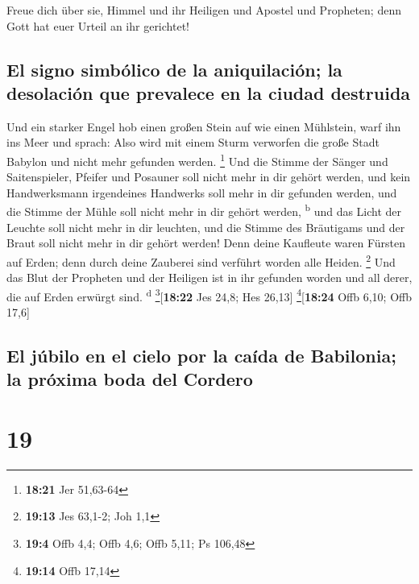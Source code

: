  Freue dich über sie, Himmel und ihr Heiligen und Apostel
und Propheten; denn Gott hat euer Urteil an ihr gerichtet!

\hypertarget{el-signo-simbuxf3lico-de-la-aniquilaciuxf3n-la-desolaciuxf3n-que-prevalece-en-la-ciudad-destruida}{%
\subsection{El signo simbólico de la aniquilación; la desolación que
prevalece en la ciudad
destruida}\label{el-signo-simbuxf3lico-de-la-aniquilaciuxf3n-la-desolaciuxf3n-que-prevalece-en-la-ciudad-destruida}}

 Und ein starker Engel hob einen großen Stein auf wie
einen Mühlstein, warf ihn ins Meer und sprach: Also wird mit einem Sturm
verworfen die große Stadt Babylon und nicht mehr gefunden werden.
\footnote{\textbf{18:21} Jer 51,63-64}  Und die Stimme
der Sänger und Saitenspieler, Pfeifer und Posauner soll nicht mehr in
dir gehört werden, und kein Handwerksmann irgendeines Handwerks soll
mehr in dir gefunden werden, und die Stimme der Mühle soll nicht mehr in
dir gehört werden, \textsuperscript{b}  und das Licht der
Leuchte soll nicht mehr in dir leuchten, und die Stimme des Bräutigams
und der Braut soll nicht mehr in dir gehört werden! Denn deine Kaufleute
waren Fürsten auf Erden; denn durch deine Zauberei sind verführt worden
alle Heiden. \footnote{\textbf{19:13} Jes 63,1-2; Joh 1,1}
 Und das Blut der Propheten und der Heiligen ist in ihr
gefunden worden und all derer, die auf Erden erwürgt sind.
\textsuperscript{d} \footnote{\textbf{19:4} Offb 4,4; Offb 4,6; Offb
  5,11; Ps 106,48}{[}\textbf{18:22} Jes 24,8; Hes 26,13{]}
\footnote{\textbf{19:14} Offb 17,14}{[}\textbf{18:24} Offb 6,10; Offb
17,6{]}

\hypertarget{el-juxfabilo-en-el-cielo-por-la-cauxedda-de-babilonia-la-pruxf3xima-boda-del-cordero}{%
\subsection{El júbilo en el cielo por la caída de Babilonia; la próxima
boda del
Cordero}\label{el-juxfabilo-en-el-cielo-por-la-cauxedda-de-babilonia-la-pruxf3xima-boda-del-cordero}}

\hypertarget{section-18}{%
\section{19}\label{section-18}}

